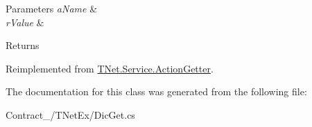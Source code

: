 \begin{DoxyParams}{Parameters}
{\em a\+Name} & \\
\hline
{\em r\+Value} & \\
\hline
\end{DoxyParams}
\begin{DoxyReturn}{Returns}

\end{DoxyReturn}


Reimplemented from \mbox{\hyperlink{class_t_net_1_1_service_1_1_action_getter_a1e62c4e643e9b9d0302275b6fa5d8ad1}{T\+Net.\+Service.\+Action\+Getter}}.



The documentation for this class was generated from the following file\+:\begin{DoxyCompactItemize}
\item 
Contract\+\_\+/\+T\+Net\+Ex/Dic\+Get.\+cs\end{DoxyCompactItemize}
